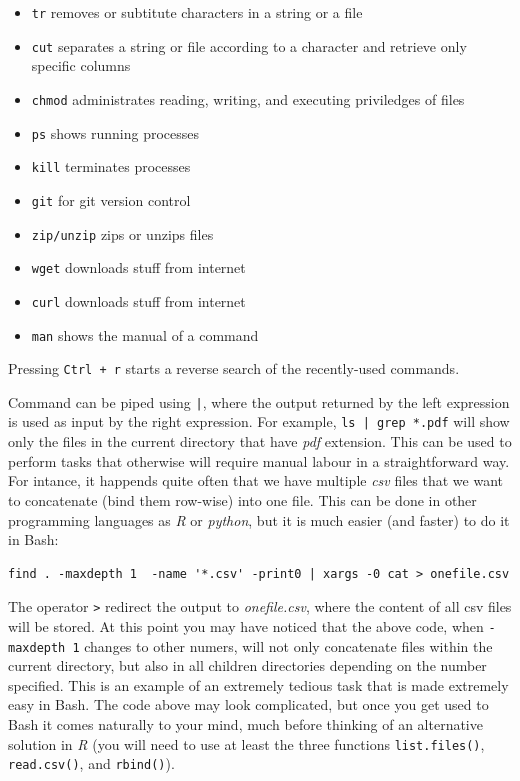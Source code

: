 \documentclass{book}
\begin{document}
\begin{itemize}
   \item[] \texttt{tr} removes or subtitute characters in a string or a file
   \item[] \texttt{cut} separates a string or file according to a character and retrieve only specific columns
   \item[] \texttt{chmod} administrates reading, writing, and executing priviledges of files
   \item[] \texttt{ps} shows running processes
   \item[] \texttt{kill} terminates processes
   \item[] \texttt{git} for git version control
   \item[] \texttt{zip/unzip} zips or unzips files
   \item[] \texttt{wget} downloads stuff from internet
   \item[] \texttt{curl} downloads stuff from internet
   \item[] \texttt{man} shows the manual of a command
\end{itemize}

Pressing \texttt{Ctrl + r} starts a reverse search of the recently-used commands.

Command can be piped using \texttt{|}, where the output returned by the left expression is used as input by the right expression. For example, \lstinline[columns=fixed]{ls | grep *.pdf} will show only the files in the current directory that have \textit{pdf} extension. This can be used to perform tasks that otherwise will require manual labour in a straightforward way. For intance, it happends quite often that we have multiple \textit{csv} files that we want to concatenate (bind them row-wise) into one file. This can be done in other programming languages as \textit{R} or \textit{python}, but it is much easier (and faster) to do it in Bash:

\begin{lstlisting}
find . -maxdepth 1  -name '*.csv' -print0 | xargs -0 cat > onefile.csv
\end{lstlisting}

The operator \texttt{>} redirect the output to \textit{onefile.csv}, where the content of all csv files will be stored. At this point you may have noticed that the above code, when \texttt{-maxdepth 1} changes to other numers, will not only concatenate files within the current directory, but also in all children directories depending on the number specified. This is an example of an extremely tedious task that is made extremely easy in Bash. The code above may look complicated, but once you get used to Bash it comes naturally to your mind, much before thinking of an alternative solution in \textit{R} (you will need to use at least the three functions \texttt{list.files()}, \texttt{read.csv()}, and \texttt{rbind()}).
\end{document}
